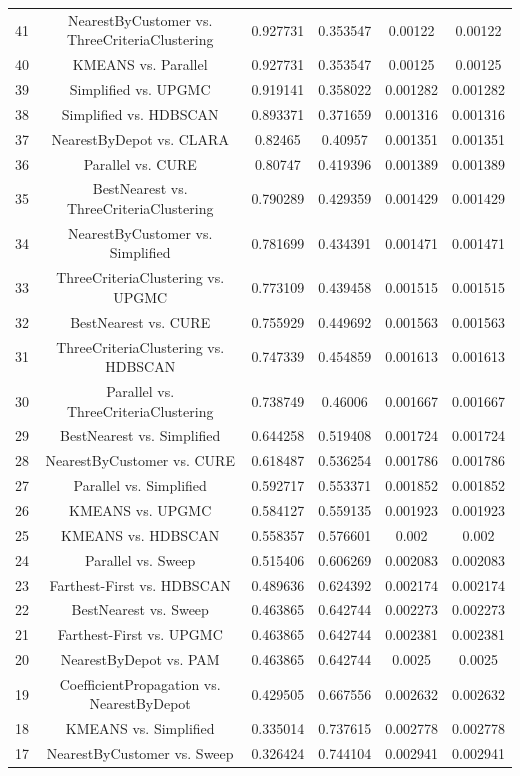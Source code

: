 \documentclass[a4paper,10pt]{article}
\begin{document}
\begin{landscape}
\begin{table}[!htp]
\begin{tabular}{cccccc}
41&NearestByCustomer vs. ThreeCriteriaClustering&0.927731&0.353547&0.00122&0.00122\\
40&KMEANS vs. Parallel&0.927731&0.353547&0.00125&0.00125\\
39&Simplified vs. UPGMC&0.919141&0.358022&0.001282&0.001282\\
38&Simplified vs. HDBSCAN&0.893371&0.371659&0.001316&0.001316\\
37&NearestByDepot vs. CLARA&0.82465&0.40957&0.001351&0.001351\\
36&Parallel vs. CURE&0.80747&0.419396&0.001389&0.001389\\
35&BestNearest vs. ThreeCriteriaClustering&0.790289&0.429359&0.001429&0.001429\\
34&NearestByCustomer vs. Simplified&0.781699&0.434391&0.001471&0.001471\\
33&ThreeCriteriaClustering vs. UPGMC&0.773109&0.439458&0.001515&0.001515\\
32&BestNearest vs. CURE&0.755929&0.449692&0.001563&0.001563\\
31&ThreeCriteriaClustering vs. HDBSCAN&0.747339&0.454859&0.001613&0.001613\\
30&Parallel vs. ThreeCriteriaClustering&0.738749&0.46006&0.001667&0.001667\\
29&BestNearest vs. Simplified&0.644258&0.519408&0.001724&0.001724\\
28&NearestByCustomer vs. CURE&0.618487&0.536254&0.001786&0.001786\\
27&Parallel vs. Simplified&0.592717&0.553371&0.001852&0.001852\\
26&KMEANS vs. UPGMC&0.584127&0.559135&0.001923&0.001923\\
25&KMEANS vs. HDBSCAN&0.558357&0.576601&0.002&0.002\\
24&Parallel vs. Sweep&0.515406&0.606269&0.002083&0.002083\\
23&Farthest-First vs. HDBSCAN&0.489636&0.624392&0.002174&0.002174\\
22&BestNearest vs. Sweep&0.463865&0.642744&0.002273&0.002273\\
21&Farthest-First vs. UPGMC&0.463865&0.642744&0.002381&0.002381\\
20&NearestByDepot vs. PAM&0.463865&0.642744&0.0025&0.0025\\
19&CoefficientPropagation vs. NearestByDepot&0.429505&0.667556&0.002632&0.002632\\
18&KMEANS vs. Simplified&0.335014&0.737615&0.002778&0.002778\\
17&NearestByCustomer vs. Sweep&0.326424&0.744104&0.002941&0.002941\\

\end{tabular}
\end{table}
\end{landscape}
\end{document}
